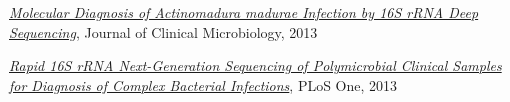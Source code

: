 \documentclass{res}
\begin{document}
\begin{resume}
\begin{thebibliography}{4}
    \href{http://jcm.asm.org/content/51/12/4262}
         {\textit{Molecular Diagnosis of Actinomadura madurae 
                  Infection by 16S rRNA Deep Sequencing}},
         Journal of Clinical Microbiology, 2013

    \href{http://journals.plos.org/plosone/article?id=10.1371/journal.pone.0065226}
         {\textit{Rapid 16S rRNA Next-Generation Sequencing of Polymicrobial 
                  Clinical Samples for Diagnosis of Complex Bacterial Infections}},
         PLoS One, 2013
\end{thebibliography}
\nocite{*}

\end{resume}
\end{document}
